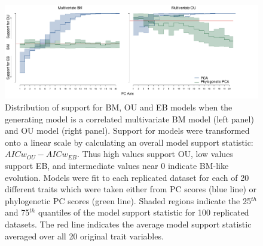 \documentclass[a4paper,11pt]{article}
\begin{document}
\begin{figure}[p]
\centering
\includegraphics[scale=0.36]{./fig/mv-aic.pdf}
\caption{Distribution of support for BM, OU and EB models when the generating model is a correlated multivariate BM model (left panel) and OU model (right panel). Support for models were transformed onto a linear scale by calculating an overall model support statistic: $AICw_{OU} - AICw_{EB}$. Thus high values support OU, low values support EB, and intermediate values near 0 indicate BM-like evolution. Models were fit to each replicated dataset for each of 20 different traits which were taken either from PC scores (blue line) or phylogenetic PC scores (green line). Shaded regions indicate the 25$^{th}$ and 75$^{th}$ quantiles of the model support statistic for  100 replicated datasets. The red line indicates the average model support statistic averaged over all 20 original trait variables.}
\label{corbm}
\end{figure}
\end{document}
